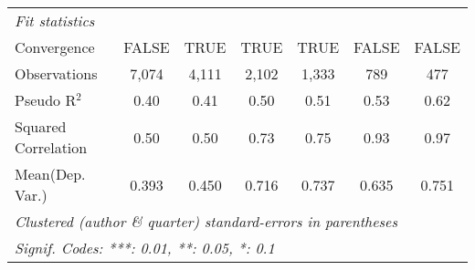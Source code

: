 \begin{tabular}{lcccccc}
   \midrule
   \emph{Fit statistics}\\
   Convergence                                                &FALSE    & TRUE        & TRUE          & TRUE          & FALSE       & FALSE\\  
   Observations                                               & 7,074   & 4,111       & 2,102         & 1,333         & 789         & 477\\  
   Pseudo R$^2$                                               & 0.40    & 0.41        & 0.50          & 0.51          & 0.53        & 0.62\\  
   Squared Correlation                                        & 0.50    & 0.50        & 0.73          & 0.75          & 0.93        & 0.97\\  
Mean(Dep. Var.) & 0.393 & 0.450 & 0.716 & 0.737 & 0.635 & 0.751 \\
   \midrule \midrule
   \multicolumn{7}{l}{\emph{Clustered (author \& quarter) standard-errors in parentheses}}\\
   \multicolumn{7}{l}{\emph{Signif. Codes: ***: 0.01, **: 0.05, *: 0.1}}\\
\end{tabular}
\par\endgroup

